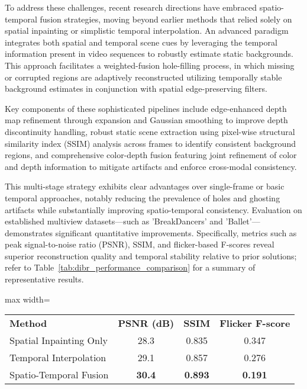 \documentclass[sigconf]{acmart}
\begin{document}
To address these challenges, recent research directions have embraced spatio-temporal fusion strategies, moving beyond earlier methods that relied solely on spatial inpainting or simplistic temporal interpolation. An advanced paradigm integrates both spatial and temporal scene cues by leveraging the temporal information present in video sequences to robustly estimate static backgrounds. This approach facilitates a weighted-fusion hole-filling process, in which missing or corrupted regions are adaptively reconstructed utilizing temporally stable background estimates in conjunction with spatial edge-preserving filters.

Key components of these sophisticated pipelines include edge-enhanced depth map refinement through expansion and Gaussian smoothing to improve depth discontinuity handling, robust static scene extraction using pixel-wise structural similarity index (SSIM) analysis across frames to identify consistent background regions, and comprehensive color-depth fusion featuring joint refinement of color and depth information to mitigate artifacts and enforce cross-modal consistency.

This multi-stage strategy exhibits clear advantages over single-frame or basic temporal approaches, notably reducing the prevalence of holes and ghosting artifacts while substantially improving spatio-temporal consistency. Evaluation on established multiview datasets—such as 'BreakDancers' and 'Ballet'—demonstrates significant quantitative improvements. Specifically, metrics such as peak signal-to-noise ratio (PSNR), SSIM, and flicker-based F-scores reveal superior reconstruction quality and temporal stability relative to prior solutions; refer to Table~\ref{tab:dibr_performance_comparison} for a summary of representative results.

\begin{table*}[htbp]
\centering
\caption{Performance comparison of DIBR approaches on multiview datasets.}
\label{tab:dibr_performance_comparison}
\begin{adjustbox}{max width=\textwidth}
\begin{tabular}{@{}lccc@{}}
\toprule
\textbf{Method} & \textbf{PSNR (dB)} & \textbf{SSIM} & \textbf{Flicker F-score} \\
Spatial Inpainting Only   & 28.3 & 0.835 & 0.347 \\
Temporal Interpolation    & 29.1 & 0.857 & 0.276 \\
Spatio-Temporal Fusion    & \textbf{30.4} & \textbf{0.893} & \textbf{0.191} \\
\bottomrule
\end{tabular}
\end{adjustbox}
\end{table*}
\end{document}
